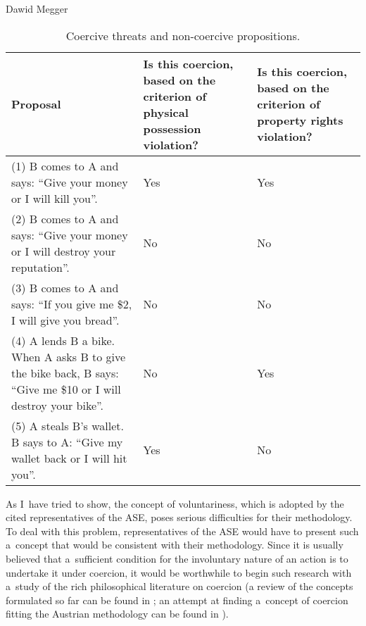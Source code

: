 \begin{artengenv}{Dawid Megger}
\begin{table}[H]
    \centering
    \begin{adjustbox}{max width=\textwidth}
        \begin{tabularx}{\textwidth}{|L{4cm}|Y|Y|}
            \hline
            \textbf{Proposal} & \textbf{Is this coercion, based on the criterion of physical possession violation?} & \textbf{Is this coercion, based on the criterion of property rights violation?} \\ \hline
            (1) B comes to A and says: “Give your money or I will kill you”. & Yes & Yes \\ \hline
            (2) B comes to A and says: “Give your money or I will destroy your reputation”. & No & No \\ \hline
            (3) B comes to A and says: “If you give me \$2, I will give you bread”. & No & No \\ \hline
            (4) A lends B a bike. When A asks B to give the bike back, B says: “Give me \$10 or I will destroy your bike”. & No & Yes \\ \hline
            (5) A steals B’s wallet. B says to A: “Give my wallet back or I will hit you”. & Yes & No \\ \hline
        \end{tabularx}
    \end{adjustbox}
    \caption{Coercive threats and non-coercive propositions.}
\end{table}



As I~have tried to show, the concept of voluntariness, which is adopted by the cited representatives of the ASE, poses serious difficulties for their methodology. To deal with this problem, representatives of the ASE would have to present such a~concept that would be consistent with their methodology. Since it is usually believed that a~sufficient condition for the involuntary nature of an action is to undertake it under coercion, it would be worthwhile to begin such research with a~study of the rich philosophical literature on coercion (a review of the concepts formulated so far can be found in 
\parencite[][]{anderson_coercion_2021}; %
 an attempt at finding a~concept of coercion fitting the Austrian methodology can be found in 
\parencite[][]{megger_coercion_2023}%
).




\end{artengenv}

